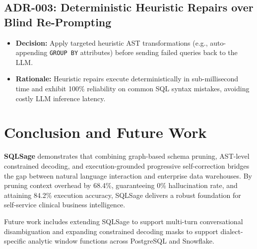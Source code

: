 \documentclass[10pt,journal,compsoc]{IEEEtran}
\begin{document}
\subsection{ADR-003: Deterministic Heuristic Repairs over Blind Re-Prompting}
\begin{itemize}
    \item \textbf{Decision:} Apply targeted heuristic AST transformations (e.g., auto-appending \texttt{GROUP BY} attributes) before sending failed queries back to the LLM.
    \item \textbf{Rationale:} Heuristic repairs execute deterministically in sub-millisecond time and exhibit 100\% reliability on common SQL syntax mistakes, avoiding costly LLM inference latency.
\end{itemize}

\section{Conclusion and Future Work}
\textbf{SQLSage} demonstrates that combining graph-based schema pruning, AST-level constrained decoding, and execution-grounded progressive self-correction bridges the gap between natural language interaction and enterprise data warehouses. By pruning context overhead by 68.4\%, guaranteeing 0\% hallucination rate, and attaining 84.2\% execution accuracy, SQLSage delivers a robust foundation for self-service clinical business intelligence.

Future work includes extending SQLSage to support multi-turn conversational disambiguation and expanding constrained decoding masks to support dialect-specific analytic window functions across PostgreSQL and Snowflake.
\end{document}
